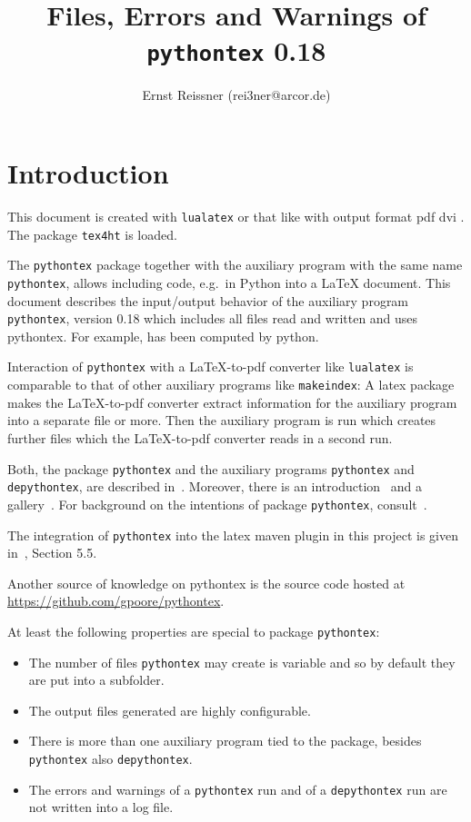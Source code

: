 \documentclass[10pt]{article}
\title{Files, Errors and Warnings of \texttt{pythontex} 0.18 }
\author{Ernst Reissner (rei3ner@arcor.de)}
\date{}
\newcommand{\lualatex}{\texttt{lualatex}}
\newcommand{\makeIndex}{\texttt{makeindex}}
\newcommand{\pytex}{\texttt{pythontex}}
\newcommand{\Ppytex}{package \texttt{pythontex}}
\newcommand{\pytexP}{\texttt{pythontex} package}
\newcommand{\dpytex}{\texttt{depythontex}}
\begin{document}
\maketitle
\tableofcontents
\listoffigures

\section{Introduction}

This document is created with \lualatex{} or that like 
with output format 
\ifpdf%
pdf%
\else
dvi%
\fi.
The package \texttt{tex4ht} 
is  loaded. 

The \pytexP{} together with the auxiliary program with the same name \pytex, 
allows including code, e.g.~in Python into a \LaTeX{} document. 
This document describes the input/output behavior of the auxiliary program \pytex, version 0.18
which includes all files read and written and uses pythontex. 
For example, \texttt{} has been computed by python. 

Interaction of \pytex{} with a \LaTeX-to-pdf converter like \lualatex{} 
is comparable to that of other auxiliary programs like \makeIndex: 
A latex package makes the \LaTeX-to-pdf converter extract information for the auxiliary program 
into a separate file or more. 
Then the auxiliary program is run which creates further files 
which the \LaTeX-to-pdf converter reads in a second run. 

Both, the package \texttt{pythontex} and the auxiliary programs \pytex{} and \dpytex, 
are described in~\cite{PythonTexP}. 
Moreover, there is an introduction~\cite{PythonTexQ} and a gallery~\cite{PythonTexG}. 
For background on the intentions of package \texttt{pythontex}, consult~\cite{PythonTexRepr}. 

The integration of \texttt{pythontex} into the latex maven plugin in this project 
is given in~\cite{LatexPlugin}, Section 5.5. 

Another source of knowledge on pythontex is the source code hosted at 
\url{https://github.com/gpoore/pythontex}. 

At least the following properties are special to \Ppytex: 
%
\begin{itemize}
  \item The number of files \pytex{} may create is variable 
  and so by default they are put into a subfolder. 
  \item The output files generated are highly configurable. 
  \item There is more than one auxiliary program tied to the package, besides \pytex{} also \dpytex. 
  \item The errors and warnings of a \pytex{} run and of a \dpytex{} run are not written into a log file. 
\end{itemize}
\end{document}
